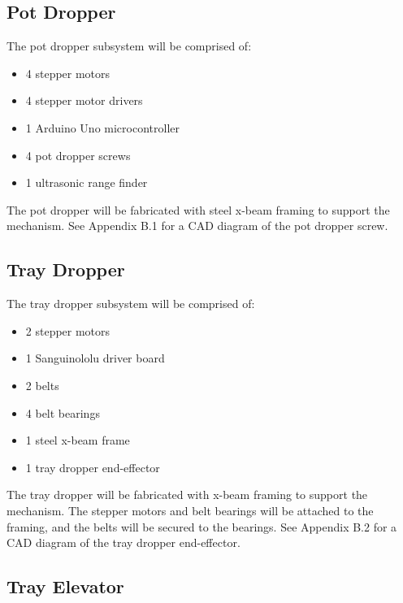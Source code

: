 \documentclass[12pt, titlepage]{article}
\begin{document}
\subsection{Pot Dropper}

The pot dropper subsystem will be comprised of:
\begin{itemize}
  \item 4 stepper motors
  \item 4 stepper motor drivers
  \item 1 Arduino Uno microcontroller
  \item 4 pot dropper screws
  \item 1 ultrasonic range finder
\end{itemize}
The pot dropper will be fabricated with steel x-beam framing to support the mechanism.
See Appendix B.1 for a CAD diagram of the pot dropper screw.

\subsection{Tray Dropper}

The tray dropper subsystem will be comprised of:
\begin{itemize}
  \item 2 stepper motors
  \item 1 Sanguinololu driver board
  \item 2 belts
  \item 4 belt bearings
  \item 1 steel x-beam frame
  \item 1 tray dropper end-effector
\end{itemize}
The tray dropper will be fabricated with x-beam framing to support the mechanism. The 
stepper motors and belt bearings will be attached to the framing, and the belts will 
be secured to the bearings. See Appendix B.2 for a CAD diagram of the tray dropper 
end-effector.

\subsection{Tray Elevator}
\end{document}
